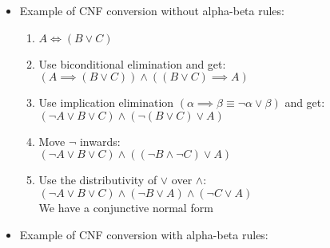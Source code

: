 \documentclass{article}
\begin{document}
\begin{itemize}
    \item Example of CNF conversion without alpha-beta rules:

    \begin{enumerate}
        \item $A \iff (B \lor C)$
        \item Use biconditional elimination and get: \\
        $(A \implies (B \lor C)) \land ((B \lor C) \implies A)$
        \item Use implication elimination $(\alpha \implies \beta \equiv \neg \alpha \lor \beta)$ and get: \\
        $(\neg A \lor B \lor C) \land (\neg(B \lor C) \lor A)$
        \item Move $\neg$ inwards: \\
        $(\neg A \lor B \lor C) \land ((\neg B \land \neg C) \lor A)$
        \item Use the distributivity of $\lor$ over $\land$: \\
        $(\neg A \lor B \lor C) \land (\neg B \lor A) \land (\neg C \lor A)$ \\
        We have a conjunctive normal form
    \end{enumerate}

    \item Example of CNF conversion with alpha-beta rules:


\end{itemize}
\end{document}
